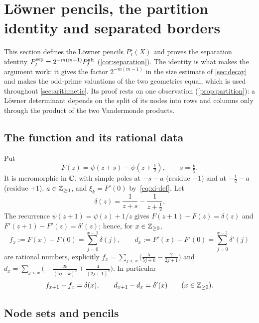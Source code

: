 \section{L\"owner pencils, the partition identity and separated borders}\label{sec:lowner}

This section defines the L\"owner pencils $P^\star_I(X)$ and proves the separation identity
$P^{\mathrm{sep}}_I=2^{-m(m-1)}P^{\mathrm{alt}}_I$ (\cref{cor:separation}). The identity is what makes the
argument work: it gives the factor $2^{-m(m-1)}$ in the size estimate of \cref{sec:decay} and
makes the odd-prime valuations of the two geometries equal, which is used throughout
\cref{sec:arithmetic}. Its proof rests on one observation (\cref{prop:partition}): a L\"owner
determinant depends on the split of its nodes into rows and columns only through the product of
the two Vandermonde products.

\subsection{The function and its rational data}\label{subsec:function}

Put
\[
  F(z)=\psi(z+s)-\psi\!\left(z+\tfrac12\right),\qquad s=\tfrac k5 .
\]
It is meromorphic in $\mathbb{C}$, with simple poles at $-s-a$ (residue $-1$) and at $-\tfrac12-a$
(residue $+1$), $a\in\mathbb{Z}_{\ge0}$, and $\xi_k=F'(0)$ by~\eqref{eq:xi-def}. Let
\[
  \delta(z)=\frac1{z+s}-\frac1{z+\frac12}.
\]
The recurrence $\psi(z+1)=\psi(z)+1/z$ \cite[5.5.2]{DLMF} gives $F(z+1)-F(z)=\delta(z)$ and
$F'(z+1)-F'(z)=\delta'(z)$; hence, for $x\in\mathbb{Z}_{\ge0}$,
\[
  f_x:=F(x)-F(0)=\sum_{j=0}^{x-1}\delta(j),\qquad
  d_x:=F'(x)-F'(0)=\sum_{j=0}^{x-1}\delta'(j)
\]
are rational numbers, explicitly
$f_x=\sum_{j<x}\bigl(\frac5{5j+k}-\frac2{2j+1}\bigr)$ and
$d_x=\sum_{j<x}\bigl(-\frac{25}{(5j+k)^2}+\frac4{(2j+1)^2}\bigr)$. In particular
\begin{equation}\label{eq:fd-increments}
  f_{x+1}-f_x=\delta(x),\qquad d_{x+1}-d_x=\delta'(x)\qquad(x\in\mathbb{Z}_{\ge0}).
\end{equation}

\subsection{Node sets and pencils}\label{subsec:pencils}

